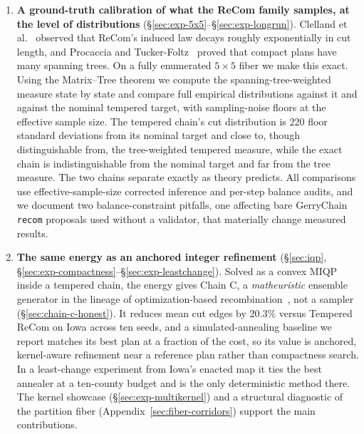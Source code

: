 \documentclass[11pt]{article}
\begin{document}
\begin{enumerate}
  \item \textbf{A ground-truth calibration of what the ReCom family
    samples, at the level of distributions}
    (\S\ref{sec:exp-5x5}--\S\ref{sec:exp-longrun}). Clelland et
    al.~\cite{clelland2021compactness} observed that ReCom's induced
    law decays roughly exponentially in cut length, and Procaccia and
    Tucker-Foltz~\cite{procaccia2022compact} proved that compact
    plans have many spanning trees. On a fully enumerated
    $5 \times 5$ fiber we make this exact. Using the Matrix--Tree
    theorem we compute the spanning-tree-weighted measure state by
    state and compare full empirical distributions against it and
    against the nominal tempered target, with sampling-noise floors
    at the effective sample size. The tempered chain's cut
    distribution is 220 floor standard deviations from its nominal
    target and close to, though distinguishable from, the
    tree-weighted tempered measure, while the exact chain is
    indistinguishable from the nominal target and far from the tree
    measure. The two chains separate exactly as theory predicts. All
    comparisons use effective-sample-size corrected inference and
    per-step balance audits, and we document two balance-constraint
    pitfalls, one affecting bare GerryChain \texttt{recom} proposals
    used without a validator, that materially change measured
    results.

  \item \textbf{The same energy as an anchored integer refinement}
    (\S\ref{sec:iqp}, \S\ref{sec:exp-compactness}--\S\ref{sec:exp-leastchange}).
    Solved as a convex MIQP inside a tempered chain, the energy gives
    Chain C, a \emph{matheuristic} ensemble generator in the lineage
    of optimization-based
    recombination~\cite{brous2025recom,cannon2023voting}, not a
    sampler (\S\ref{sec:chain-c-honest}). It reduces mean cut edges
    by $20.3\%$ versus Tempered ReCom on Iowa across ten seeds, and
    a simulated-annealing baseline we report matches its best plan
    at a fraction of the cost, so its value is anchored, kernel-aware
    refinement near a reference plan rather than compactness search.
    In a least-change experiment from Iowa's enacted map it ties the
    best annealer at a ten-county budget and is the only
    deterministic method there. The kernel showcase
    (\S\ref{sec:exp-multikernel}) and a structural diagnostic of the
    partition fiber (Appendix~\ref{sec:fiber-corridors}) support the
    main contributions.
\end{enumerate}
\end{document}
